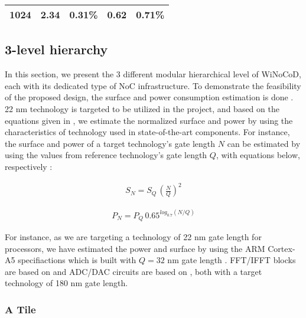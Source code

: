 \begin{table}[]
\begin{tabular}{|l|l|l|l|l|}
1024                                                                                           & 2.34                                                                                                          & 0.31\%                                                                                                                                             & 0.62 & 0.71\%                                                                                                                                               \\ \hline
\end{tabular}
\end{table}



\subsection{3-level hierarchy}

In this section, we present the 3 different modular hierarchical level of WiNoCoD, each with its dedicated type of NoC infrastructure. To demonstrate the feasibility of the proposed design, the surface and power consumption estimation is done \cite{briere2015dynamically}. 22 nm technology is targeted to be utilized in the project, and based on the equations given in \cite{semiconductor2013itrs}, we estimate the normalized surface and power by using the characteristics of technology used in state-of-the-art components. For instance, the surface and power of a target technology's gate length $N$ can be estimated by using the values from reference technology's gate length $Q$, with equations below, respectively :

\begin{align}
	S_{N} = S_{Q} \, (\frac{N}{Q})^{2}
\end{align}

\begin{align}
	P_{N} = P_{Q} \, 0.65^{log_{0.7}(N/Q)}
\end{align} 

For instance, as we are targeting a technology of 22 nm gate length for processors, we have estimated the power and surface by using the ARM Cortex-A5 specifiactions which is built with $Q=32$ nm gate length \cite{sewell2012swizzle}. FFT/IFFT blocks are based on \cite{sung2009reconfigurable} and ADC/DAC circuits are based on \cite{chan20123}, both with a target technology of 180 nm gate length. 
    
\subsubsection{A Tile}

